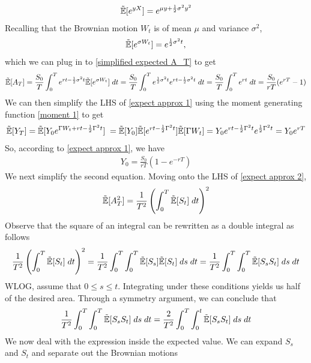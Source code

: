 \documentclass[reqno]{amsart}
\newcommand{\rE}[1]{\tilde{\E}[#1]}
\begin{document}
\begin{align} \label{moment 1}
     \rE{e^{yX}}
     = e^{\mu y + \frac{1}{2} \sigma^2 y^2}
\end{align}
Recalling that the Brownian motion $W_t$ is of mean $\mu$ and variance $\sigma^2$, 
\begin{align} 
     \rE{e^{\sigma W_t}}
     = e^{\frac{1}{2}\sigma^2 t},
\end{align}
which we can plug in to \eqref{simplified expected A_T} to get
\begin{align} 
     \rE{A_T}
     = \frac{S_0}{T} \int_0^T e^{rt-\frac{1}{2}\sigma^2t} \rE{e^{\sigma W_t}}  \; dt
     = \frac{S_0}{T} \int_0^T e^{\frac{1}{2}\sigma^2 t} e^{rt-\frac{1}{2}\sigma^2t} \; dt
     = \frac{S_0}{T} \int_0^T e^{rt} \; dt
     = \frac{S_0}{rT} (e^{rT}-1)
\end{align}
We can then simplify the LHS of \eqref{expect approx 1} using the moment generating function \eqref{moment 1} to get
\begin{align} 
     \rE{Y_T} 
     = \rE{Y_0e^{\Gamma W_t+rt-\frac{1}{2}\Gamma^2t}} \;
     = \rE{Y_0} \rE{e^{rt - \frac{1}{2}\Gamma^2t}} \rE{\Gamma W_t}
     = Y_0 e^{rt - \frac{1}{2}\Gamma^2t} e^{\frac{1}{2}\Gamma^2 t}
     = Y_0 e^{rT}
\end{align}
So, according to \eqref{expect approx 1}, we have
\begin{align} \label{calibration 1 r neq 0}
     Y_0 = \frac{S_0}{rT}(1-e^{-rT})
\end{align}
We next simplify the second equation. Moving onto the LHS of \eqref{expect approx 2},
\begin{align}
     \rE{A_T^2}
     = {\frac{1}{T^2} \left(\int_0^T \rE{S_t} \; dt\right)^2}
\end{align}
Observe that the square of an integral can be rewritten as a double integral as follows
\begin{align}
     {\frac{1}{T^2} \left(\int_0^T \rE{S_t} \; dt\right)^2}
     = {\frac{1}{T^2} \int_0^T \int_0^T \rE{S_s} \rE{S_t} \; ds \; dt}
     = {\frac{1}{T^2} \int_0^T \int_0^T \rE{S_s S_t} \; ds \; dt}
\end{align}
WLOG, assume that $0 \leq s \leq t$. Integrating under these conditions yields us half of the desired area. Through a symmetry argument, we can conclude that
\begin{align}
     {\frac{1}{T^2} \int_0^T \int_0^T \rE{S_s S_t} \; ds \; dt}
     = {\frac{2}{T^2} \int_0^T \int_0^t \rE{S_s S_t} \; ds \; dt}
\end{align}
We now deal with the expression inside the expected value. We can expand $S_s$ and $S_t$ and separate out the Brownian motions
\end{document}
